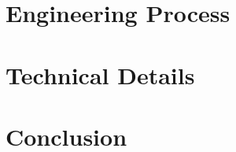 \documentclass[11pt]{article}
\begin{document}
    

    \section{Engineering Process}\label{sec:eng-process}
    

    \section{Technical Details}\label{sec:technical-details}
    

    \section{Conclusion}\label{sec:conclusion}
    
\end{document}
